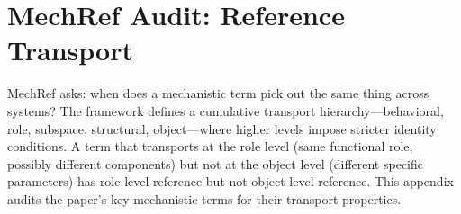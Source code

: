 
\providecommand{\cmark}{\textcolor{green!60!black}{\checkmark}}%
\providecommand{\pmark}{\textcolor{orange!80!black}{$\sim$}}%
\providecommand{\xmark}{\textcolor{red!70!black}{$\times$}}%

\section{MechRef Audit: Reference Transport}
\label{app:mechref}

MechRef \citep{tower2026mechreference} asks: when does a mechanistic term
pick out the same thing across systems? The framework defines a cumulative
transport hierarchy---behavioral, role, subspace, structural, object---where
higher levels impose stricter identity conditions. A term that transports at
the role level (same functional role, possibly different components) but not
at the object level (different specific parameters) has role-level reference
but not object-level reference. This appendix audits the paper's key
mechanistic terms for their transport properties.


